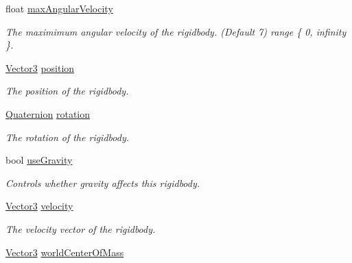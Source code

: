\begin{DoxyCompactItemize}
float \mbox{\hyperlink{class_lua_1_1_rigidbody_a8171fc4d6eb8d7e448eeb45f9fbc05d8}{max\+Angular\+Velocity}}
\begin{DoxyCompactList}\small\item\em The maximimum angular velocity of the rigidbody. (Default 7) range \{ 0, infinity \}. \end{DoxyCompactList}\item 
\mbox{\hyperlink{class_lua_1_1_vector3}{Vector3}} \mbox{\hyperlink{class_lua_1_1_rigidbody_a9bef020808bd389b43ac5d2f7d429dc9}{position}}
\begin{DoxyCompactList}\small\item\em The position of the rigidbody. \end{DoxyCompactList}\item 
\mbox{\hyperlink{class_lua_1_1_quaternion}{Quaternion}} \mbox{\hyperlink{class_lua_1_1_rigidbody_a6cb1207363fce98ec04cacf8c6f776cc}{rotation}}
\begin{DoxyCompactList}\small\item\em The rotation of the rigidbody. \end{DoxyCompactList}\item 
bool \mbox{\hyperlink{class_lua_1_1_rigidbody_a3838f1418140279bcec4d7a2f8ebbae2}{use\+Gravity}}
\begin{DoxyCompactList}\small\item\em Controls whether gravity affects this rigidbody. \end{DoxyCompactList}\item 
\mbox{\hyperlink{class_lua_1_1_vector3}{Vector3}} \mbox{\hyperlink{class_lua_1_1_rigidbody_abbc468f41391b7d34120f11f3f39b6fb}{velocity}}
\begin{DoxyCompactList}\small\item\em The velocity vector of the rigidbody. \end{DoxyCompactList}\item 
\mbox{\hyperlink{class_lua_1_1_vector3}{Vector3}} \mbox{\hyperlink{class_lua_1_1_rigidbody_a23530e52ed361ac1f758e8204a1c833b}{world\+Center\+Of\+Mass}}

\end{DoxyCompactItemize}

